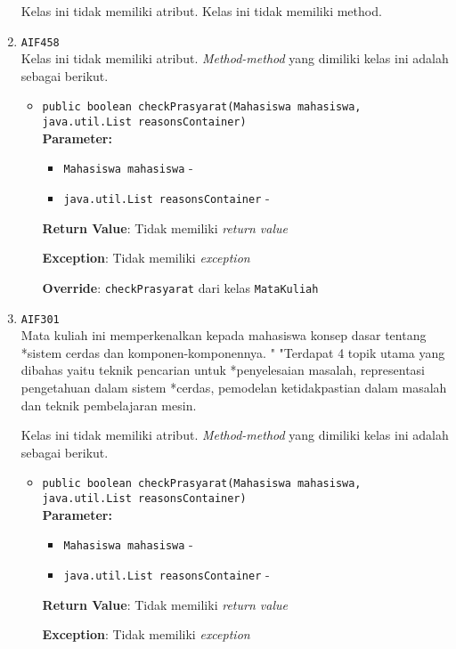 \documentclass{article}
\begin{document}
\begin{enumerate}
Kelas ini tidak memiliki atribut. Kelas ini tidak memiliki method. \item \texttt{AIF458}\\ 


Kelas ini tidak memiliki atribut. \textit{Method-method} yang dimiliki kelas ini adalah sebagai berikut.
\begin{itemize}
\item \texttt{public boolean checkPrasyarat(Mahasiswa mahasiswa, java.util.List reasonsContainer)}\\ 


\textbf{Parameter:}\begin{itemize}
\item \texttt{Mahasiswa mahasiswa} - 
\item \texttt{java.util.List reasonsContainer} - 
\end{itemize}
\textbf{Return Value}: Tidak memiliki \textit{return value}

\textbf{Exception}: Tidak memiliki \textit{exception}

\textbf{Override}: \texttt{checkPrasyarat} dari kelas \texttt{MataKuliah}

\end{itemize}
\item \texttt{AIF301}\\ 
Mata kuliah ini memperkenalkan kepada mahasiswa konsep dasar tentang *sistem
 cerdas dan komponen-komponennya. " "Terdapat 4 topik utama yang dibahas yaitu
 teknik pencarian untuk *penyelesaian masalah, representasi pengetahuan dalam
 sistem *cerdas, pemodelan ketidakpastian dalam masalah dan teknik
 pembelajaran mesin.

Kelas ini tidak memiliki atribut. \textit{Method-method} yang dimiliki kelas ini adalah sebagai berikut.
\begin{itemize}
\item \texttt{public boolean checkPrasyarat(Mahasiswa mahasiswa, java.util.List reasonsContainer)}\\ 


\textbf{Parameter:}\begin{itemize}
\item \texttt{Mahasiswa mahasiswa} - 
\item \texttt{java.util.List reasonsContainer} - 
\end{itemize}
\textbf{Return Value}: Tidak memiliki \textit{return value}

\textbf{Exception}: Tidak memiliki \textit{exception}


\end{itemize}
\end{enumerate}
\end{document}
